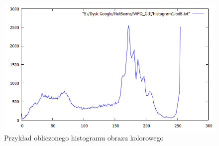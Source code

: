 \documentclass{article}
\begin{document}
\begin{figure}[!ht]
	\includegraphics[scale=0.3]{img/histogram/obliczanie-b}
	\caption{Przykład obliczonego histogramu obrazu kolorowego}
	\label{fig16}	
	\end{figure}	
	
	
\end{document}
